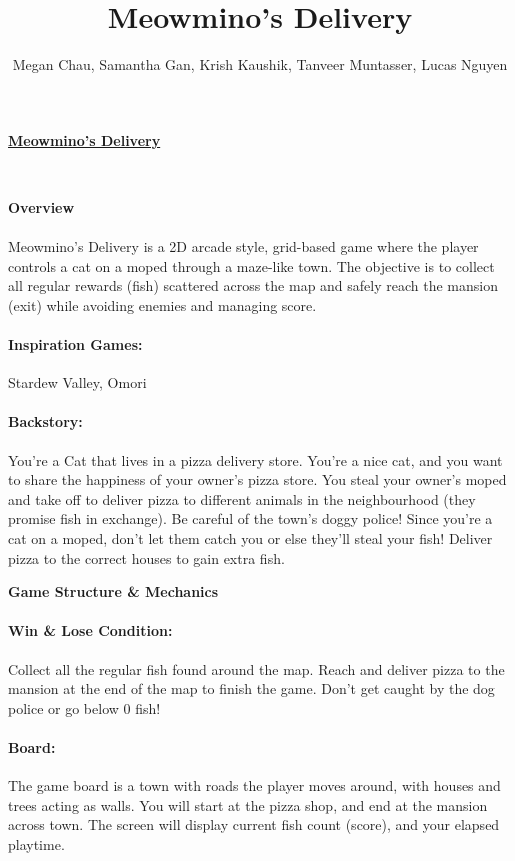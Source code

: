 \documentclass{article}
\title{Meowmino's Delivery}
\author{Megan Chau, Samantha Gan, Krish Kaushik, Tanveer Muntasser, Lucas Nguyen}
\begin{document}

{\centering \LARGE \underline{\textbf{Meowmino's Delivery}}\\}
\bigskip

{\\}

\bigskip
{\centering \large{\textbf{Overview}}\\}

\paragraph{}
Meowmino’s Delivery is a 2D arcade style, grid-based game where the player controls a cat on a moped through a maze-like town. The objective is to collect all regular rewards (fish) scattered across the map and safely reach the mansion (exit) while avoiding enemies and managing score.

\paragraph{Inspiration Games:}Stardew Valley, Omori 

\paragraph{Backstory:}You're a Cat that lives in a pizza delivery store. You're a nice cat, and you want to share the happiness of your owner's pizza store. You steal your owner's moped and take off to deliver pizza to different animals in the neighbourhood (they promise fish in exchange). Be careful of the town’s doggy police! Since you’re a cat on a moped, don’t let them catch you or else they’ll steal your fish! Deliver pizza to the correct houses to gain extra fish. 

\bigskip
{\centering \large{\textbf{Game Structure \& Mechanics}}\\}
\smallskip

\paragraph{Win \& Lose Condition:}Collect all the regular fish found around the map. Reach and deliver pizza to the mansion at the end of the map to finish the game. Don't get caught by the dog police or go below 0 fish!

\paragraph{Board:}The game board is a town with roads the player moves around, with houses and trees acting as walls. You will start at the pizza shop, and end at the mansion across town.
The screen will display current fish count (score), and your elapsed playtime.
\end{document}
